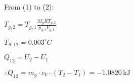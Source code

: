 From (1) to (2):  

\( T_{g,2} = T_{g,1} \frac{M_g R T_{g,2}}{p_{g,2} V_{g,1}} \)

\( T_{S,12} = 0.003^\circ C \)  

\( Q_{12} = U_2 - U_1 \)  

\( \therefore Q_{12} = m_g \cdot c_V \cdot (T_2 - T_1) = -1.0820 \, \text{kJ} \)